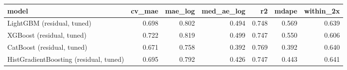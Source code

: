 \begin{tabular}{lrrrrrr}
\toprule
model & cv_mae & mae_log & med_ae_log & r2 & mdape & within_2x \\
\midrule
LightGBM (residual, tuned) & 0.698 & 0.802 & 0.494 & 0.748 & 0.569 & 0.639 \\
XGBoost (residual, tuned) & 0.722 & 0.819 & 0.499 & 0.747 & 0.550 & 0.606 \\
CatBoost (residual, tuned) & 0.671 & 0.758 & 0.392 & 0.769 & 0.392 & 0.640 \\
HistGradientBoosting (residual, tuned) & 0.695 & 0.792 & 0.426 & 0.747 & 0.443 & 0.641 \\
\bottomrule
\end{tabular}
